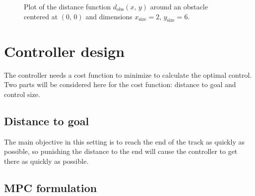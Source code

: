 \documentclass{article}
\begin{document}
\begin{figure}[!ht]
  \centering
  \caption{Plot of the distance function $d_{\mathrm{obs}}(x,\,y)$ around an obstacle centered at $(0,\,0)$ and dimensions $x_{\mathrm{size}}=2$, $y_{\mathrm{size}}=6$.}
  \label{fig:obsdistfunc}
\end{figure}

\section{Controller design}
The controller needs a cost function to minimize to calculate the optimal control. Two parts will be considered here for the cost function: distance to goal and control size.

\subsection{Distance to goal}
The main objective in this setting is to reach the end of the track as quickly as possible, so punishing the distance to the end will cause the controller to get there as quickly as possible.

\subsection{MPC formulation}
\end{document}
